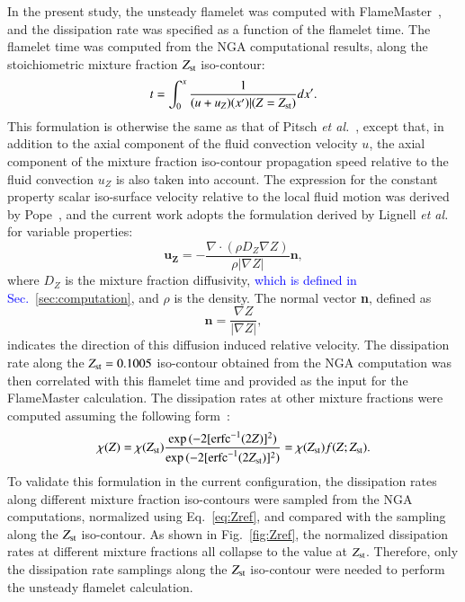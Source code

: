 \documentclass[review,3p,times]{elsarticle}
\begin{document}
In the present study, the unsteady flamelet was computed with FlameMaster~\cite{flamemaster}, and the dissipation rate was specified as a function of the flamelet time.  The flamelet time was computed from the NGA computational results, along the stoichiometric mixture fraction $Z_{\rm st}$ iso-contour: 
 \begin{equation} \label{eq:t}
t = \int ^{x}_{0} \frac{1}{(u + u_Z)(x')|(Z=Z_{\rm st})} dx'.
\end{equation}
This formulation is otherwise the same as that of Pitsch \emph {et al.}~\cite{pitsch98a}, except that, in addition to the axial component of the fluid convection velocity $u$, the axial component of the mixture fraction iso-contour propagation speed relative to the fluid convection $u_Z$ is also taken into account.  The expression for the constant property scalar iso-surface velocity relative to the local fluid motion was derived by Pope~\cite{pope88}, and the current work adopts the formulation derived by Lignell \emph {et al.}~\cite{lignell07} for variable properties:
\begin{equation}
\mathbf{u_Z} = -\frac{\nabla \cdot (\rho D_Z \nabla Z) }{\rho |\nabla Z|} \mathbf{n},
\end{equation}  
where $D_Z$ is the mixture fraction diffusivity, \textcolor{blue}{which is defined in Sec.~\ref{sec:computation}}, and $\rho$ is the density.  The normal vector \textbf{n}, defined as
\begin{equation}
\mathbf{n} = \frac{\nabla Z}{|\nabla Z|},
\end{equation}
indicates the direction of this diffusion induced relative velocity.
The dissipation rate along the $Z_{\rm st} = 0.1005$ iso-contour obtained from the NGA computation was then correlated with this flamelet time and provided as the input for the FlameMaster calculation.  The dissipation rates at other mixture fractions were computed assuming the following form~\cite{petersbook}:
\begin{equation} \label{eq:Zref}
\chi{(Z)} = \chi{(Z_{\rm st})} \frac{\exp{(-2[{\rm erfc}^{-1}(2Z)]^2)}}{\exp{(-2[{\rm erfc}^{-1}(2Z_{\rm st})]^2)}} = \chi{(Z_{\rm st})} f(Z;Z_{\rm st}).
\end{equation}
To validate this formulation in the current configuration, the dissipation rates along different mixture fraction iso-contours were sampled from the NGA computations, normalized using Eq.~\ref{eq:Zref}, and compared with the sampling along the $Z_{\rm st}$ iso-contour.  As shown in Fig.~\ref{fig:Zref}, the normalized dissipation rates at different mixture fractions all collapse to the value at $Z_{\rm st}$.  Therefore, only the dissipation rate samplings along the $Z_{\rm st}$ iso-contour were needed to perform the unsteady flamelet calculation.
\end{document}
